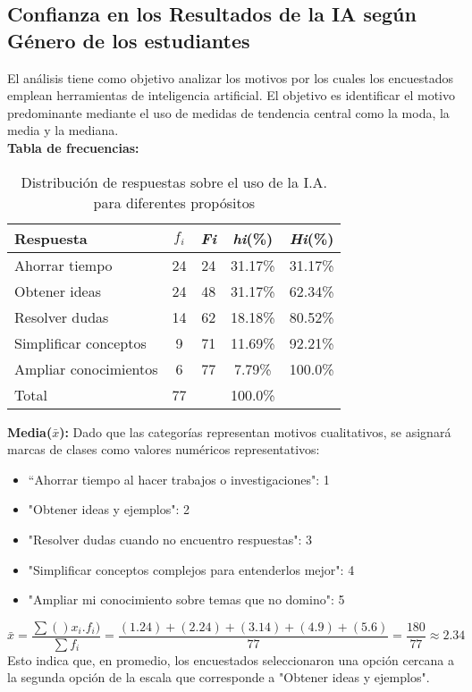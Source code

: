 \subsection{Confianza en los Resultados de la IA según Género de los estudiantes}
El análisis tiene como objetivo analizar los motivos por los cuales los encuestados emplean herramientas de inteligencia artificial. El objetivo es identificar el motivo predominante mediante el uso de medidas de tendencia central como la moda, la media y la mediana.\\

\textbf{Tabla de frecuencias:}
\begin{table}[H]
	\centering
	\renewcommand{\arraystretch}{1.2}
	\begin{tabular}{l c c c c}
		\hline
		{Respuesta} & {\(f_i\)} & \textit{Fi} & \textit{hi}(\%) & \textit{Hi}(\%)\\
		\hline
		Ahorrar tiempo        & 24 & 24 & 31.17\% & 31.17\%\\
		Obtener ideas         & 24 & 48 & 31.17\% & 62.34\%\\
		Resolver dudas        & 14 & 62 & 18.18\% & 80.52\%\\
		Simplificar conceptos & 9  & 71 & 11.69\% & 92.21\%\\
		Ampliar conocimientos & 6  & 77 & 7.79\%  & 100.0\%\\
		\hline
		Total                 & 77 &    & 100.0\%\\
		\hline
	\end{tabular}
	\caption{Distribución de respuestas sobre el uso de la I.A. para diferentes propósitos}
	\label{tabla:motivos}
\end{table}

\textbf{Media($\bar{x}$):} Dado que las categorías representan motivos cualitativos, se asignará marcas de clases como valores numéricos representativos:
\begin{itemize}
	\item “Ahorrar tiempo al hacer trabajos o investigaciones": 1
	\item "Obtener ideas y ejemplos": 2
	\item "Resolver dudas cuando no encuentro respuestas": 3
	\item "Simplificar conceptos complejos para entenderlos mejor": 4
	\item "Ampliar mi conocimiento sobre temas que no domino": 5
\end{itemize}
\begin{equation*}
	\bar{x} = \frac{\sum ()x_i . f_i)}{\sum f_i} = \frac{(1 . 24)+ (2 . 24) + (3 . 14) + (4 . 9) + (5 . 6)}{77} = \frac{180}{77} \approx 2.34
\end{equation*}
Esto indica que, en promedio, los encuestados seleccionaron una opción cercana a la segunda opción de la escala que corresponde a "Obtener ideas y ejemplos".

